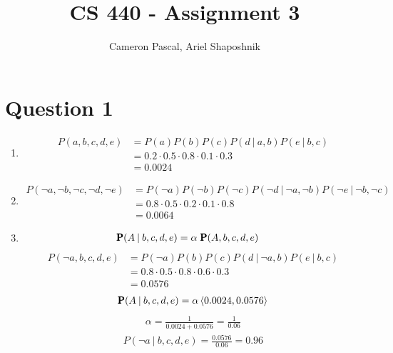 \documentclass[a4paper, 12pt, one column, aas_macros]{article}
\title{CS 440 - Assignment 3}
\author{Cameron Pascal, Ariel Shaposhnik}
\newcommand\given[1][]{\:#1\vert\:}
\begin{document}
\maketitle

\section*{Question 1}
  \begin{enumerate}[label=\alph*]
    \item 
      \begin{align*}
        P(a, b, c, d, e) &= P(a)P(b)P(c)P(d\given a, b)P(e\given b, c) \\ 
        &= 0.2 \cdot 0.5 \cdot 0.8 \cdot 0.1 \cdot 0.3 \\ 
        &= 0.0024
      \end{align*}
    \item 
    \begin{align*}
      P(\neg a, \neg b, \neg c, \neg d, \neg e) &= P(\neg a)P(\neg b)P(\neg c)P(\neg d\given \neg a, \neg b)P(\neg e\given \neg b, \neg c) \\ 
      &= 0.8 \cdot 0.5 \cdot 0.2 \cdot 0.1 \cdot 0.8 \\ 
      &= 0.0064
    \end{align*}
    \item 
    \begin{align*}
      &\text{\pmb{P}}(A\given b, c, d, e) = \alpha \text{\pmb{ P}}(A, b, c, d, e)
    \end{align*}
    \begin{align*}
      P(\neg a, b, c, d, e) &= P(\neg a)P(b)P(c)P(d \given \neg a, b)P(e \given b, c) \\ 
      &= 0.8 \cdot 0.5 \cdot 0.8 \cdot 0.6 \cdot 0.3 \\ 
      &= 0.0576
    \end{align*}
    \begin{align*}
      \text{\pmb{P}}(A \given b, c, d, e) = \alpha \braket{0.0024, 0.0576}
    \end{align*}
    \begin{align*}
      \alpha = \frac{1}{0.0024 + 0.0576} = \frac{1}{0.06}
    \end{align*}
    \begin{align*}
      P(\neg a \given b, c, d, e) = \frac{0.0576}{0.06} = 0.96
    \end{align*}
  \end{enumerate}
\end{document}
